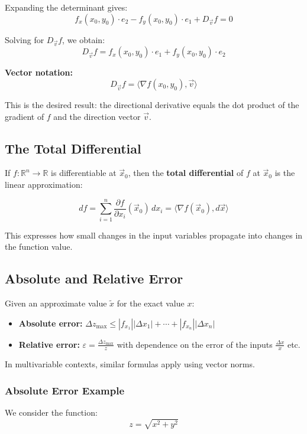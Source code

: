 Expanding the determinant gives:
\[
f_x(x_0, y_0) \cdot e_2 - f_y(x_0, y_0) \cdot e_1 + D_{\vec{v}}f = 0
\]

Solving for \( D_{\vec{v}}f \), we obtain:
\[
D_{\vec{v}}f = f_x(x_0, y_0) \cdot e_1 + f_y(x_0, y_0) \cdot e_2
\]

\textbf{Vector notation:}
\[
D_{\vec{v}}f = \langle \nabla f(x_0, y_0), \vec{v} \rangle
\]

This is the desired result: the directional derivative equals the dot product of the gradient of \( f \) and the direction vector \( \vec{v} \).

\subsection{The Total Differential}

If \( f : \mathbb{R}^n \to \mathbb{R} \) is differentiable at \( \vec{x}_0 \), then the \textbf{total differential} of \( f \) at \( \vec{x}_0 \) is the linear approximation:

\[
df = \sum_{i=1}^n \frac{\partial f}{\partial x_i}(\vec{x}_0) \, dx_i = \langle \nabla f(\vec{x}_0), d\vec{x} \rangle
\]

This expresses how small changes in the input variables propagate into changes in the function value.


\subsection{Absolute and Relative Error}

Given an approximate value \( \tilde{x} \) for the exact value \( x \):

\begin{itemize}[label=\(-\)]
\item \textbf{Absolute error:} \(\Delta z_{\max} \le |f_{x_1}||\Delta x_1| + \cdots + |f_{x_n}||\Delta x_n| \)
\item \textbf{Relative error:} \( \varepsilon = \frac{\Delta z_{\max}}{z}\) with dependence on the error of the inputs \(\frac{\Delta x}{x}\) etc.
\end{itemize}

In multivariable contexts, similar formulas apply using vector norms.

\subsubsection*{Absolute Error Example}

We consider the function:
\[
z = \sqrt{x^2 + y^2}
\]

